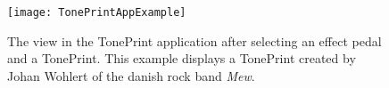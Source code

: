 \begin{figure}[H]
	\centering
	\texttt{[image: TonePrintAppExample]}
	\caption{The view in the TonePrint application after selecting an effect pedal and a TonePrint. This example displays a TonePrint created by Johan Wohlert of the danish rock band \textit{Mew}.}
	\label{fig:TonePrintAppExample}
\end{figure}
















